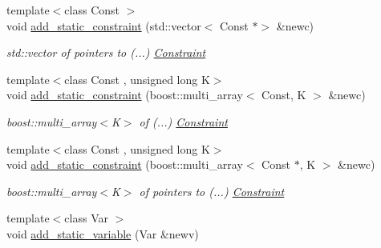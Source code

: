 \begin{Indent}
\begin{DoxyCompactItemize}
\mbox{\label{class_s_m_spp__di__unipi__it_1_1_block_aa8e266c9c049983ce2e8f12455aaf99d}} 
{\footnotesize template$<$class Const $>$ }\\void \mbox{\hyperlink{class_s_m_spp__di__unipi__it_1_1_block_aa8e266c9c049983ce2e8f12455aaf99d}{add\+\_\+static\+\_\+constraint}} (std\+::vector$<$ Const $\ast$$>$ \&newc)
\begin{DoxyCompactList}\small\item\em std\+::vector of pointers to (...) \mbox{\hyperlink{class_s_m_spp__di__unipi__it_1_1_constraint}{Constraint}} \end{DoxyCompactList}\item 
\mbox{\label{class_s_m_spp__di__unipi__it_1_1_block_ad84f0e93685d78c20e1e12c23e0dce2b}} 
{\footnotesize template$<$class Const , unsigned long K$>$ }\\void \mbox{\hyperlink{class_s_m_spp__di__unipi__it_1_1_block_ad84f0e93685d78c20e1e12c23e0dce2b}{add\+\_\+static\+\_\+constraint}} (boost\+::multi\+\_\+array$<$ Const, K $>$ \&newc)
\begin{DoxyCompactList}\small\item\em boost\+::multi\+\_\+array$<$\+K$>$ of (...) \mbox{\hyperlink{class_s_m_spp__di__unipi__it_1_1_constraint}{Constraint}} \end{DoxyCompactList}\item 
\mbox{\label{class_s_m_spp__di__unipi__it_1_1_block_a12abc747f82d012dfedabcf1a1a17d36}} 
{\footnotesize template$<$class Const , unsigned long K$>$ }\\void \mbox{\hyperlink{class_s_m_spp__di__unipi__it_1_1_block_a12abc747f82d012dfedabcf1a1a17d36}{add\+\_\+static\+\_\+constraint}} (boost\+::multi\+\_\+array$<$ Const $\ast$, K $>$ \&newc)
\begin{DoxyCompactList}\small\item\em boost\+::multi\+\_\+array$<$\+K$>$ of pointers to (...) \mbox{\hyperlink{class_s_m_spp__di__unipi__it_1_1_constraint}{Constraint}} \end{DoxyCompactList}\item 
\mbox{\label{class_s_m_spp__di__unipi__it_1_1_block_ab8247ae8b4fca28c044253ac5f0779c9}} 
{\footnotesize template$<$class Var $>$ }\\void \mbox{\hyperlink{class_s_m_spp__di__unipi__it_1_1_block_ab8247ae8b4fca28c044253ac5f0779c9}{add\+\_\+static\+\_\+variable}} (Var \&newv)
$$
\end{DoxyCompactItemize}
\end{Indent}
